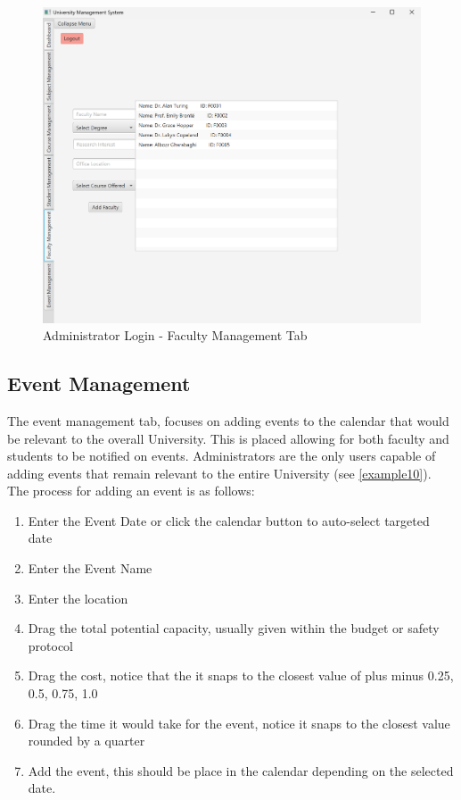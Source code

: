 \begin{figure}[ht]
    \centering
        \centering\includegraphics[width=1\linewidth]{figures/Faculty_Management.png}
        \caption{Administrator Login - Faculty Management Tab}
        \label{fig:example9}  
\end{figure}


\newpage
\subsection{Event Management}
The event management tab, focuses on adding events to the calendar that would be relevant to the overall University. This is placed allowing for both faculty and students to be notified on events. Administrators are the only users capable of adding events that remain relevant to the entire University (see \autoref{example10}). The process for adding an event is as follows:
\begin{enumerate}
    \item Enter the Event Date or click the calendar button to auto-select targeted date
    \item Enter the Event Name
    \item Enter the location
    \item Drag the total potential capacity, usually given within the budget or safety protocol
    \item Drag the cost, notice that the it snaps to the closest value of plus minus 0.25, 0.5, 0.75, 1.0
    \item Drag the time it would take for the event, notice it snaps to the closest value rounded by a quarter
    \item Add the event, this should be place in the calendar depending on the selected date.
    
\end{enumerate}

